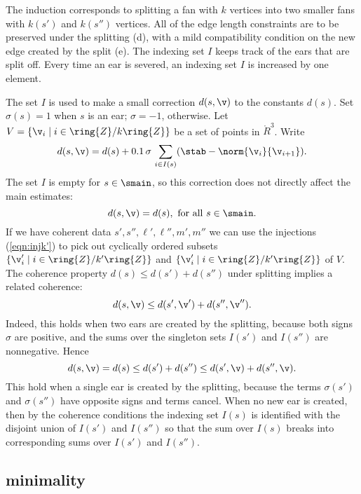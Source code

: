 The induction corresponds to splitting a fan with $k$ vertices into
two smaller fans with $k(s')$ and $k(s'')$ vertices.  All of the edge
length constraints are to be preserved under the splitting (d), with a
mild compatibility condition on the new edge created by the split (e).
The indexing set $I$ keeps track of the ears that are split off.
Every time an ear is severed, an indexing set $I$ is increased by one
element.

The set $I$ is used to make a small correction $d(s,\v)$ to the
constants $d(s)$.  Set $\sigma(s) =1$ when $s$ is an ear;  $\sigma =
-1$, otherwise.  Let $V=\{\v_i\mid i\in \ring{Z}/k\ring{Z}\}$ 
be a set of points in $\ring{R}^3$.
Write
\begin{equation}
d(s,\v) = d(s) +  0.1\, \sigma\,\sum_{i\in I(s)} (\stab - \norm{\v_i}{\v_{i+1}}).
\end{equation}
The set $I$ is empty for $s\in \smain$, so this correction does not
directly affect the main estimates:
\[
d(s,\v) = d(s), \text{ for all } s \in \smain.
\]
If we have coherent data $s',s'',\ell',\ell'',m',m''$ we can use the injections 
(\ref{eqn:injk'}) to pick out  cyclically ordered subsets
$\{\v'_i\mid i\in \ring{Z}/k'\ring{Z}\}$
and $\{\v'_i\mid i\in \ring{Z}/k'\ring{Z}\}$ of $V$.
The coherence property $d(s)\le d(s') + d(s'')$ under splitting
implies a related coherence:
\begin{equation}
d(s,\v) \le d(s',\v') + d(s'',\v'').
\end{equation}
Indeed, this holds when two ears are created by the splitting, 
because both signs $\sigma$ are positive,
and the sums over the singleton sets $I(s')$ and $I(s'')$ are nonnegative.
Hence
\[
d(s,\v) = d(s) \le d(s') + d(s'') \le d(s',\v) + d(s'',\v).
\]
This hold when a single ear is created by the splitting, because the
terms $\sigma(s')$ and $\sigma(s'')$ have opposite signs and terms cancel.
When no new ear is created, then by the coherence conditions the indexing
set $I(s)$ is identified with the disjoint union of $I(s')$ and $I(s'')$ so that
the sum over $I(s)$ breaks into corresponding sums over
$I(s')$ and $I(s'')$.


\subsection{minimality}


